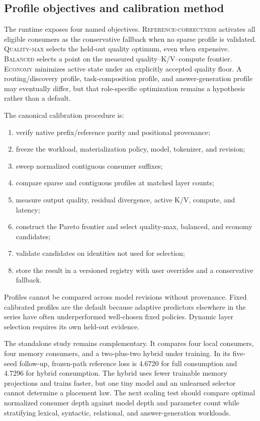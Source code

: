 \documentclass[11pt]{article}
\begin{document}
\subsection{Profile objectives and calibration method}

The runtime exposes four named objectives.  \textsc{Reference-correctness} activates all eligible
consumers as the conservative fallback when no sparse profile is validated.  \textsc{Quality-max}
selects the held-out quality optimum, even when expensive.  \textsc{Balanced} selects a point on
the measured quality--K/V--compute frontier.  \textsc{Economy} minimizes active state under an
explicitly accepted quality floor.  A routing/discovery profile, task-composition profile, and
answer-generation profile may eventually differ, but that role-specific optimization remains a
hypothesis rather than a default.

The canonical calibration procedure is:
\begin{enumerate}
\item verify native prefix/reference parity and positional provenance;
\item freeze the workload, materialization policy, model, tokenizer, and revision;
\item sweep normalized contiguous consumer suffixes;
\item compare sparse and contiguous profiles at matched layer counts;
\item measure output quality, residual divergence, active K/V, compute, and latency;
\item construct the Pareto frontier and select quality-max, balanced, and economy candidates;
\item validate candidates on identities not used for selection;
\item store the result in a versioned registry with user overrides and a conservative fallback.
\end{enumerate}
Profiles cannot be compared across model revisions without provenance.  Fixed calibrated profiles
are the default because adaptive predictors elsewhere in the series have often underperformed
well-chosen fixed policies.  Dynamic layer selection requires its own held-out evidence.

The standalone study remains complementary.  It compares four local consumers, four memory
consumers, and a two-plus-two hybrid under training.  In its five-seed follow-up, frozen-path
reference loss is 4.6720 for full consumption and 4.7296 for hybrid consumption.  The hybrid uses
fewer trainable memory projections and trains faster, but one tiny model and an unlearned selector
cannot determine a placement law.  The next scaling test should compare optimal normalized
consumer depth against model depth and parameter count while stratifying lexical, syntactic,
relational, and answer-generation workloads.
\fi
\end{document}
